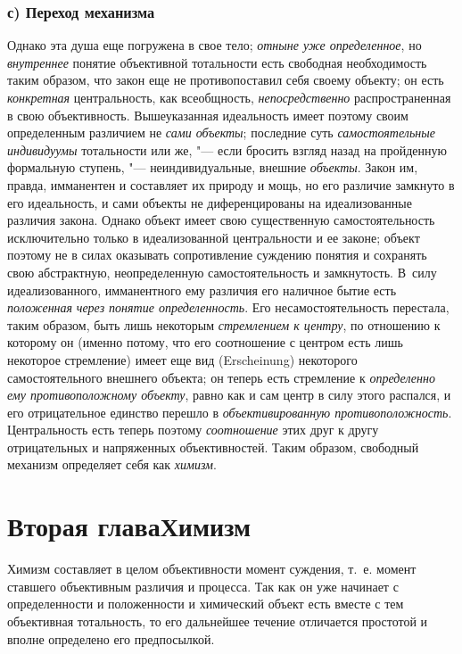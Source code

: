 {{\subsection[с) Переход механизма]{с) Переход механизма}
Однако эта душа еще погружена в свое тело;
{\em отныне уже определенное},
но {\em внутреннее}
понятие объективной тотальности есть свободная необходимость
таким образом, что закон еще не противопоставил себя своему объекту; он
есть {\em конкретная}
центральность, как всеобщность,
{\em непосредственно}
распространенная в свою объективность. Вышеуказанная
идеальность имеет поэтому своим определенным различием не
{\em сами объекты};
последние суть
{\em самостоятельные индивидуумы}
тотальности или же, "--- если бросить взгляд
назад на пройденную формальную ступень, "--- неиндивидуальные,
внешние {\em объекты}.
Закон им, правда, имманентен и составляет их природу и мощь,
но его различие замкнуто в его идеальность, и сами объекты не
диференцированы на идеализованные различия закона. Однако объект имеет свою
существенную самостоятельность исключительно только в идеализованной
центральности и ее законе; объект поэтому не в силах оказывать
сопротивление суждению понятия и сохранять свою абстрактную, неопределенную
самостоятельность и замкнутость. В~силу идеализованного, имманентного ему
различия его наличное бытие есть
{\em положенная}
{\em через понятие определенность}.
Его несамостоятельность перестала, таким образом, быть лишь
некоторым {\em стремлением к центру},
по отношению к которому он (именно потому, что его
соотношение с центром есть лишь некоторое стремление) имеет еще вид
(Erscheinung) некоторого самостоятельного внешнего объекта;
он теперь есть стремление к
{\em определенно ему противоположному
объекту}, равно как и сам центр в силу этого распался, и его
отрицательное единство перешло в
{\em объективированную
противоположность}. Центральность есть теперь
поэтому
{\em соотношение} этих
друг к другу отрицательных и напряженных объективностей. Таким образом,
свободный механизм определяет себя как
{\em химизм}.

\chapter[Вторая глава Химизм]{Вторая глава\newline Химизм}
Химизм составляет в целом объективности момент суждения, т.~е.
момент ставшего объективным различия и процесса. Так как он уже начинает с
определенности и положенности и химический объект есть вместе с тем
объективная тотальность, то его дальнейшее течение отличается простотой и
вполне определено его предпосылкой.

}}
